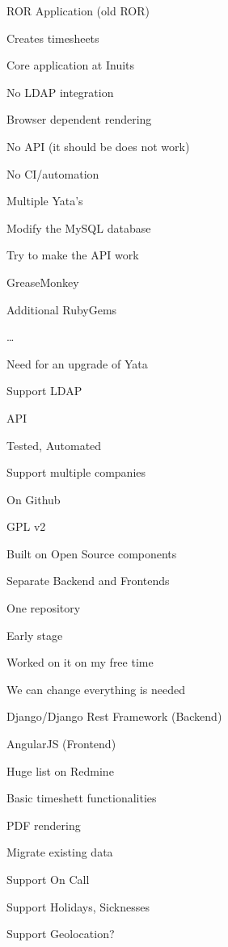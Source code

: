 \titleSlide


\inuitsSlide


\begin{iframe}[Yata]
\item ROR Application (old ROR)
\item Creates timesheets
\item Core application at Inuits
\end{iframe}
\begin{iframe}
\item No LDAP integration
\item Browser dependent rendering
\item No API (it should be does not work)
\item No CI/automation
\item Multiple Yata's
\end{iframe}
\begin{iframe}
\item Modify the MySQL database
\item Try to make the API work
\item GreaseMonkey
\item Additional RubyGems
\item \dots
\end{iframe}
\begin{iframe}[YaYaTa]
\item Need for an upgrade of Yata
\item Support LDAP
\item API
\item Tested, Automated
\item Support multiple companies
\end{iframe}
\begin{iframe}
\item On Github
\item GPL v2
\item Built on Open Source components
\item Separate Backend and Frontends
\item One repository
\end{iframe}
\begin{iframe}
\item Early stage
\item Worked on it on my free time
\item We can change everything is needed
\end{iframe}
\begin{iframe}[Technologies]
\item Django/Django Rest Framework (Backend)
\item AngularJS (Frontend)
\end{iframe}
\begin{iframe}[TODO]
\item Huge list on Redmine
\item Basic timeshett functionalities
\item PDF rendering
\item Migrate existing data
\item Support On Call
\item Support Holidays, Sicknesses
\item Support Geolocation?
\end{iframe}

